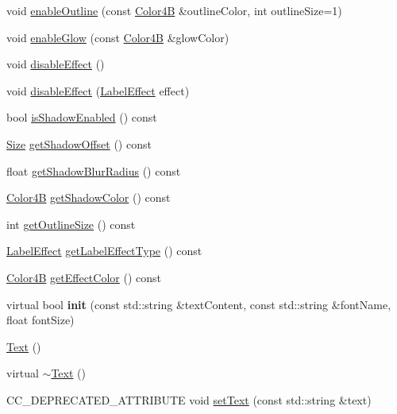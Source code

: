 \begin{DoxyCompactItemize}
void \hyperlink{classui_1_1Text_a435c6f84cf8281e81f23e1752edabf1d}{enable\+Outline} (const \hyperlink{structColor4B}{Color4B} \&outline\+Color, int outline\+Size=1)
\item 
void \hyperlink{classui_1_1Text_ab97e762c34ec74d27b94077903554b8f}{enable\+Glow} (const \hyperlink{structColor4B}{Color4B} \&glow\+Color)
\item 
void \hyperlink{classui_1_1Text_a22b6f3c5bd093ff0c8b37f1a8b498be2}{disable\+Effect} ()
\item 
void \hyperlink{classui_1_1Text_a055d25e9e367be1fa2353990b4fd6759}{disable\+Effect} (\hyperlink{group__base_ga26fd049ca5303e0cf4435208058f32e4}{Label\+Effect} effect)
\item 
bool \hyperlink{classui_1_1Text_ab6aca46711275ba0c974eb5848a1734a}{is\+Shadow\+Enabled} () const
\item 
\hyperlink{classSize}{Size} \hyperlink{classui_1_1Text_a2b38813a4904e5a091ce5ea4db5e3b3b}{get\+Shadow\+Offset} () const
\item 
float \hyperlink{classui_1_1Text_a301af594fb5f9f5b5b75fe7319f7fb3e}{get\+Shadow\+Blur\+Radius} () const
\item 
\hyperlink{structColor4B}{Color4B} \hyperlink{classui_1_1Text_a7f10cfa20f088433f478f7d87eaecbd5}{get\+Shadow\+Color} () const
\item 
int \hyperlink{classui_1_1Text_a77a19a21a2950313a469b2021461a076}{get\+Outline\+Size} () const
\item 
\hyperlink{group__base_ga26fd049ca5303e0cf4435208058f32e4}{Label\+Effect} \hyperlink{classui_1_1Text_a48bc2818885677b1b58ce5faf860bf24}{get\+Label\+Effect\+Type} () const
\item 
\hyperlink{structColor4B}{Color4B} \hyperlink{classui_1_1Text_a7dea98904863fbc99c51169576f346f6}{get\+Effect\+Color} () const
\item 
\mbox{\label{classui_1_1Text_afce66c7193867b419ad23be9f3f81dc7}} 
virtual bool {\bfseries init} (const std\+::string \&text\+Content, const std\+::string \&font\+Name, float font\+Size)
\item 
\hyperlink{classui_1_1Text_aa48e386c0963d21ee49737dd33ade66c}{Text} ()
\item 
virtual \hyperlink{classui_1_1Text_a3022f24c5b895f8b50bd8f03b3ed08c0}{$\sim$\+Text} ()
\item 
C\+C\+\_\+\+D\+E\+P\+R\+E\+C\+A\+T\+E\+D\+\_\+\+A\+T\+T\+R\+I\+B\+U\+TE void \hyperlink{classui_1_1Text_a2c5da36c598db2803c5fd0a30cc8c7c9}{set\+Text} (const std\+::string \&text)

\end{DoxyCompactItemize}
